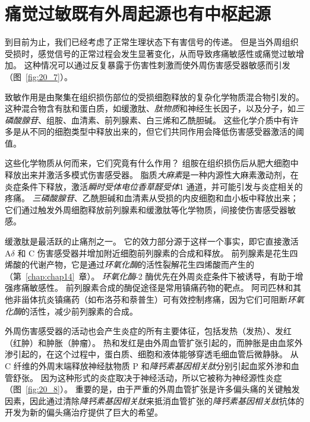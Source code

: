 \section{痛觉过敏既有外周起源也有中枢起源}

到目前为止，我们已经考虑了正常生理状态下有害信号的传递。
但是当外周组织受损时，感觉信号的正常过程会发生显著变化，从而导致疼痛敏感性或痛觉过敏增加。
这种情况可以通过反复暴露于伤害性刺激而使外周伤害感受器敏感而引发（图~\ref{fig:20_7}）。


致敏作用是由聚集在组织损伤部位的受损细胞释放的复杂化学物质混合物引发的。
这种混合物含有肽和蛋白质，如缓激肽、\textit{肽物质}和神经生长因子，以及分子，如\textit{三磷酸腺苷}、组胺、血清素、前列腺素、白三烯和乙酰胆碱。
这些化学介质中有许多是从不同的细胞类型中释放出来的，但它们共同作用会降低伤害感受器激活的阈值。


这些化学物质从何而来，它们究竟有什么作用？
组胺在组织损伤后从肥大细胞中释放出来并激活多模式伤害感受器。
脂质\textit{大麻素}是一种内源性大麻素激动剂，在炎症条件下释放，激活\textit{瞬时受体电位香草醛受体}1 通道，并可能引发与炎症相关的疼痛。
\textit{三磷酸腺苷}、乙酰胆碱和血清素从受损的内皮细胞和血小板中释放出来；
它们通过触发外周细胞释放前列腺素和缓激肽等化学物质，间接使伤害感受器敏感。


缓激肽是最活跃的止痛剂之一。
它的效力部分源于这样一个事实，即它直接激活 A$\delta$ 和 C 伤害感受器并增加附近细胞前列腺素的合成和释放。
前列腺素是花生四烯酸的代谢产物，它是通过\textit{环氧化酶}的活性裂解花生四烯酸而产生的（第~\ref{chap:chap14}~章）。
\textit{环氧化酶}-2 酶优先在外周炎症条件下被诱导，有助于增强疼痛敏感性。
前列腺素合成的酶促途径是常用镇痛药物的靶点。
阿司匹林和其他非甾体抗炎镇痛药（如布洛芬和萘普生）可有效控制疼痛，因为它们可阻断\textit{环氧化酶}的活性，减少前列腺素的合成。


外周伤害感受器的活动也会产生炎症的所有主要体征，包括发热（发热）、发红（红肿）和肿胀（肿瘤）。
热和发红是由外周血管扩张引起的，而肿胀是由血浆外渗引起的，在这个过程中，蛋白质、细胞和液体能够穿透毛细血管后微静脉。
从 C 纤维的外周末端释放神经肽物质 P 和\textit{降钙素基因相关肽}分别引起血浆外渗和血管舒张。
因为这种形式的炎症取决于神经活动，所以它被称为神经源性炎症（图~\ref{fig:20_8}）。
重要的是，由于严重的外周血管扩张是许多偏头痛的关键触发因素，因此通过清除\textit{降钙素基因相关肽}来抵消血管扩张的\textit{降钙素基因相关肽}抗体的开发为新的偏头痛治疗提供了巨大的希望。


